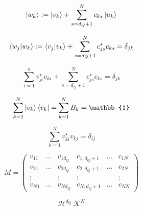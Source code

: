 \begin{equation}
\ket{w_{k}} := \ket{v_{k}} + \sum_{s=d_{Q}+1}^{N} c_{k s} \ket{u_{k}}
\end{equation}

\begin{equation}
\bra{w_{j}} \ket{w_{k}} := \bra{v_{j}} \ket{v_{k}} + \sum_{s=d_{Q}+1}^{N} c_{j s}^{\star} c_{k s} = \delta_{j k}
\end{equation}

\begin{equation}
\sum_{i=1}^{n} v_{j i}^{\star} v_{k i} + \sum_{s=d_{Q}+1}^{N} c_{j s}^{\star} c_{k s} = \delta_{j k}
\end{equation}

\begin{equation}
\sum_{k=1}^{N}\ket{v_{k}}\bra{v_{k}} = \sum_{k=1}^{N} B_{k} = \mathbb{1}
\end{equation}


\begin{equation}
\sum_{k=1}^{N}v_{k i}^{\star} v_{k j} = \delta_{ij}
\end{equation}

\begin{equation}
M = 
\begin{pmatrix}
v_{1 1} & \dots & v_{1 d_{Q}} & c_{1,d_{Q}+1} & \dots & c_{1 N} \\
v_{2 1} & \dots & v_{2 d_{Q}} & c_{2,d_{Q}+1} & \dots & c_{2 N} \\
\vdots &  & \vdots & \vdots &  & \vdots \\
v_{N1} & \dots & v_{Nd_{Q}} & c_{N,d_Q+1} & \dots & c_{NN}
\end{pmatrix}    
\end{equation}

\[\mathcal{H}^{d_Q}\ \mathcal{K}^{N}\]